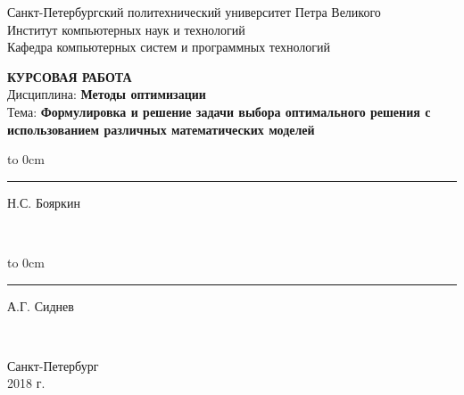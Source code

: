 	\begin{titlepage}
		\begin{center}
			\large {Санкт-Петербургский политехнический университет Петра Великого\\
				Институт компьютерных наук и технологий}\\
				Кафедра компьютерных систем и программных технологий
		\end{center}

		\vfill
		\begin{center}
			\large{\textbf{КУРСОВАЯ РАБОТА} \\ \vspace*{2cm}
			Дисциплина: \textbf{Методы оптимизации}\\
			Тема: \textbf{Формулировка и решение задачи выбора оптимального решения с использованием различных математических моделей}}
		\end{center}
		
		\vfill
		
		\hfill\parbox{9 cm}{\hspace*{3cm}\hbox to 0cm{\raisebox{-1em}{\small(подпись)}}\hspace*{-0.8cm}\rule{3cm}{0.8pt} Н.С. Бояркин}\\[0.6cm]
		
		 \hfill\parbox{9 cm}{\hspace*{3cm}\hbox to 0cm{\raisebox{-1em}{\small(подпись)}}\hspace*{-0.8cm}\rule{3cm}{0.8pt} А.Г. Сиднев}\\[0.6cm]
		
		\vspace{\fill}
		\begin{center}
			Санкт-Петербург \\ 2018 г.
		\end{center}
	\end{titlepage}
\setcounter{page}{3}